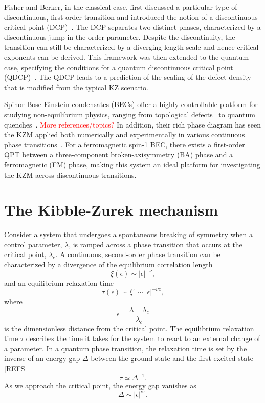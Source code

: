 Fisher and Berker, in the classical case, first discussed a particular type of
discontinuous, first-order transition and introduced the notion of a
discontinuous critical point (DCP)~\cite{Fisher1982}.
The DCP separates two distinct phases, characterized by a discontinuous jump
in the order parameter.
Despite the discontinuity, the transition can still be characterized by a
diverging length scale and hence critical exponents can be derived.
This framework was then extended to the quantum case, specifying the conditions
for a quantum discontinuous critical point (QDCP)~\cite{Suzuki2015}.
The QDCP leads to a prediction of the scaling of the defect density that is
modified from the typical KZ scenario.

Spinor Bose-Einstein condensates (BECs) offer a highly controllable platform
for studying non-equilibrium physics, ranging from topological
defects~\cite{Lovegrove2014, Borgh2016} to quantum
quenches~\cite{Symes2017, Prufer2018, Schmied2019}.
\textcolor{red}{More references/topics?}
In addition, their rich phase diagram has seen the KZM applied both numerically
and experimentally in various continuous phase transitions~\cite{Damski2007,
Saito2007A, Saito2007B, Swislocki2013, Witkowska2013, Anquez2016}.
For a ferromagnetic spin-1 BEC, there exists a first-order QPT between a
three-component broken-axisymmetry (BA) phase and a ferromagnetic (FM) phase,
making this system an ideal platform for investigating the KZM across
discontinuous transitions.

\section{The Kibble-Zurek mechanism}\label{sec:the-KZM}
Consider a system that undergoes a spontaneous breaking of symmetry when a
control parameter, \( \lambda \), is ramped across a phase transition that occurs
at the critical point, \( \lambda_c \).
A continuous, second-order phase transition can be characterized by a divergence
of the equilibrium correlation length
\begin{equation}
    \xi(\epsilon) \sim |\epsilon|^{-\nu},
\end{equation}
and an equilibrium relaxation time
\begin{equation}
    \tau(\epsilon) \sim \xi^z \sim |\epsilon|^{-\nu z},
    \label{eq: equil-relax-time}
\end{equation}
where
\begin{equation}
    \epsilon = \frac{\lambda - \lambda_c}{\lambda_c}
\end{equation}
is the dimensionless distance from the critical point.
The equilibrium relaxation time \( \tau \) describes the time it takes for the
system to react to an external change of a parameter.
In a quantum phase transition, the relaxation time is set by the inverse of an
energy gap \( \Delta \) between the ground state and the first excited state [REFS]
\begin{equation}
    \tau \simeq \Delta^{-1}.
\end{equation}
As we approach the critical point, the energy gap vanishes as
\begin{equation}
    \Delta \sim |\epsilon|^{\nu z}.
\end{equation}


